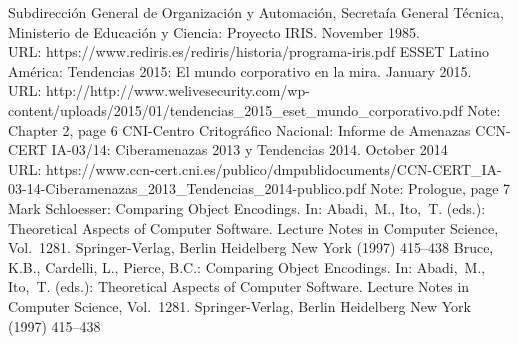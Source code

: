 \documentclass[a4paper]{llncs}
\begin{document}
\begin{thebibliography}{5}
Subdirección General de Organización y Automación, Secretaía General Técnica, Ministerio de Educación y Ciencia:
Proyecto IRIS.
November 1985.\\
URL: https://www.rediris.es/rediris/historia/programa-iris.pdf
%
ESSET Latino América:
Tendencias 2015: El mundo corporativo en la mira.
January 2015.\\
URL: http://http://www.welivesecurity.com/wp-content/uploads/2015/01/tendencias\_2015\_eset\_mundo\_corporativo.pdf
Note: Chapter 2, page 6
%
CNI-Centro Critográfico Nacional:
Informe de Amenazas CCN-CERT IA-03/14: Ciberamenazas 2013 y Tendencias 2014.
October 2014\\
URL: https://www.ccn-cert.cni.es/publico/dmpublidocuments/CCN-CERT\_IA-03-14-Ciberamenazas\_2013\_Tendencias\_2014-publico.pdf
Note: Prologue, page 7
%
Mark Schloesser:
Comparing Object Encodings.
In: Abadi,~M., Ito,~T. (eds.):
Theoretical Aspects of Computer Software.
Lecture Notes in Computer Science, Vol.~1281.
Springer-Verlag, Berlin Heidelberg New York (1997) 415--438
%
Bruce, K.B., Cardelli, L., Pierce, B.C.:
Comparing Object Encodings.
In: Abadi,~M., Ito,~T. (eds.):
Theoretical Aspects of Computer Software.
Lecture Notes in Computer Science, Vol.~1281.
Springer-Verlag, Berlin Heidelberg New York (1997) 415--438
%
\end{thebibliography}
\end{document}
